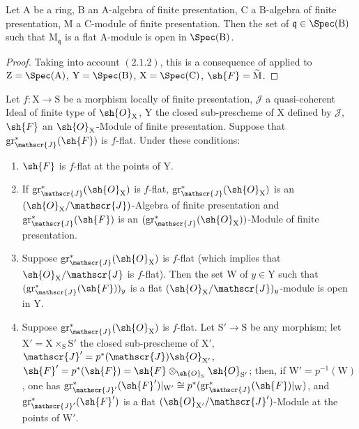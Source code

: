 \begin{corollary}[11.3.3]
\label{IV.11.3.3}
Let $\mathrm{A}$ be a ring, $\mathrm{B}$ an $\mathrm{A}$-algebra of finite presentation, $\mathrm{C}$ a $\mathrm{B}$-algebra of finite presentation, $\mathrm{M}$ a $\mathrm{C}$-module of finite presentation. Then the set of $\mathfrak{q}\in\Spec(\mathrm{B})$ such that $\mathrm{M}_\mathfrak{q}$ is a flat $\mathrm{A}$-module is open in $\Spec(\mathrm{B})$.
\end{corollary}

\begin{proof}
Taking into account $(2.1.2)$, this is a consequence of  applied to $\mathrm{Z}=\Spec(\mathrm{A})$, $\mathrm{Y}=\Spec(\mathrm{B})$, $\mathrm{X}=\Spec(\mathrm{C})$, $\sh{F}=\widetilde{\mathrm{M}}$.
\end{proof}

\begin{proposition}[11.3.4]
\label{IV.11.3.4}
Let $f:\mathrm{X}\to\mathrm{S}$ be a morphism locally of finite presentation, $\mathscr{J}$ a quasi-coherent Ideal of finite type of $\sh{O}_\mathrm{X}$, $\mathrm{Y}$ the closed sub-prescheme of $\mathrm{X}$ defined by $\mathscr{J}$, $\sh{F}$ an $\sh{O}_\mathrm{X}$-Module of finite presentation. Suppose that $\operatorname{gr}^*_\mathscr{J}(\sh{F})$ is $f$-flat. Under these conditions:
\begin{enumerate}[label=\emph{(\roman*)}]
  \item $\sh{F}$ is $f$-flat at the points of $\mathrm{Y}$.
  \item If $\operatorname{gr}^*_\mathscr{J}(\sh{O}_\mathrm{X})$ is $f$-flat, $\operatorname{gr}^*_\mathscr{J}(\sh{O}_\mathrm{X})$ is an $(\sh{O}_\mathrm{X}/\mathscr{J})$-Algebra of finite presentation and $\operatorname{gr}^*_\mathscr{J}(\sh{F})$ is an $(\operatorname{gr}^*_\mathscr{J}(\sh{O}_\mathrm{X}))$-Module of finite presentation.
  \item Suppose $\operatorname{gr}^*_\mathscr{J}(\sh{O}_\mathrm{X})$ is $f$-flat (which implies that $\sh{O}_\mathrm{X}/\mathscr{J}$ is $f$-flat). Then the set $\mathrm{W}$ of $y\in\mathrm{Y}$ such that $(\operatorname{gr}^*_\mathscr{J}(\sh{F}))_y$ is a flat $(\sh{O}_\mathrm{X}/\mathscr{J})_y$-module is open in $\mathrm{Y}$.
  \item Suppose $\operatorname{gr}^*_\mathscr{J}(\sh{O}_\mathrm{X})$ is $f$-flat. Let $\mathrm{S}'\to\mathrm{S}$ be any morphism; let $\mathrm{X}'=\mathrm{X}\times_\mathrm{S}\mathrm{S}'$ the closed sub-prescheme of $\mathrm{X}'$, $\mathscr{J}'=p^*(\mathscr{J})\sh{O}_{\mathrm{X}'}$, $\sh{F}'=p^*(\sh{F})=\sh{F}\otimes_{\sh{O}_\mathrm{S}}\sh{O}_{\mathrm{S}'}$; then, if $\mathrm{W}'=p^{-1}(\mathrm{W})$, one has $\operatorname{gr}^*_{\mathscr{J}'}(\sh{F}')|_{\mathrm{W}'}\cong p^*(\operatorname{gr}^*_\mathscr{J}(\sh{F})|_\mathrm{W})$, and $\operatorname{gr}^*_{\mathscr{J}'}(\sh{F}')$ is a flat $(\sh{O}_{\mathrm{X}'}/\mathscr{J}')$-Module at the points of $\mathrm{W}'$.
\end{enumerate}
\end{proposition}

